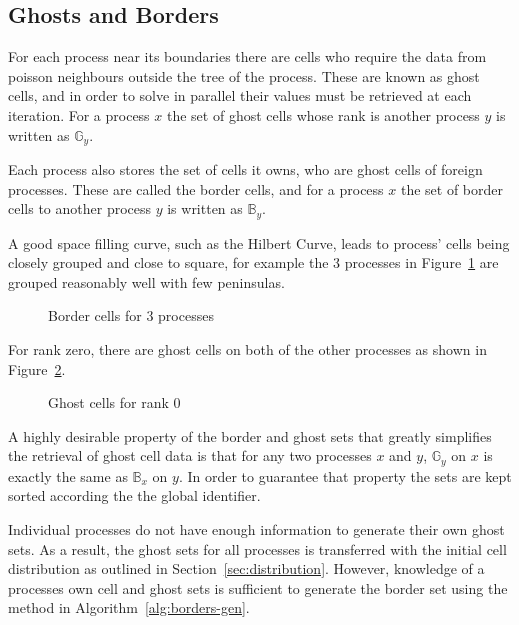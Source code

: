 \documentclass[twoside]{IIBproject}
\numberwithin{figure}{section}
\begin{document}


    \subsection{Ghosts and Borders} %
        \label{sec:ghostsandborders}

        For each process near its boundaries there are cells who require the data from poisson neighbours outside the tree of the process. These are known as ghost cells, and in order to solve in parallel their values must be retrieved at each iteration. For a process $x$ the set of ghost cells whose rank is another process $y$ is written as $\mathbb{G}_y$.

        Each process also stores the set of cells it owns, who are ghost cells of foreign processes. These are called the border cells, and for a process $x$ the set of border cells to another process $y$ is written as $\mathbb{B}_y$.

        A good space filling curve, such as the Hilbert Curve, leads to process' cells being closely grouped and close to square, for example the 3 processes in Figure~\ref{fig:borderline} are grouped reasonably well with few peninsulas.

        \begin{figure}[!htbp]
            
            \caption{Border cells for 3 processes}
            \label{fig:borderline}
        \end{figure}

        For rank zero, there are ghost cells on both of the other processes as shown in Figure~\ref{fig:borders-r0}.

        \begin{figure}[!htbp]
            
            \caption{Ghost cells for rank 0}
            \label{fig:borders-r0}
        \end{figure}

        A highly desirable property of the border and ghost sets that greatly simplifies the retrieval of ghost cell data is that for any two processes $x$ and $y$, $\mathbb{G}_y$ on $x$ is exactly the same as $\mathbb{B}_x$ on $y$. In order to guarantee that property the sets are kept sorted according the the global identifier.

        Individual processes do not have enough information to generate their own ghost sets. As a result, the ghost sets for all processes is transferred with the initial cell distribution as outlined in Section~\ref{sec:distribution}. However, knowledge of a processes own cell and ghost sets is sufficient to generate the border set using the method in Algorithm~\ref{alg:borders-gen}.
\end{document}
